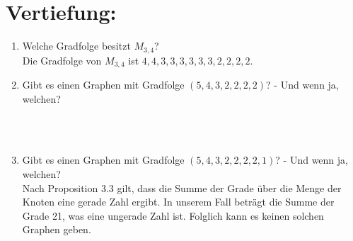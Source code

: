 

\usepackage{tikz} 


    \maketitle
    \section*{Vertiefung:}
    \begin{enumerate}[label=(\alph*)]
        \item Welche Gradfolge besitzt $M_{3,4}$?\\
        Die Gradfolge von $M_{3,4}$ ist $4,4,3,3,3,3,3,3,2,2,2,2$.

        \item Gibt es einen Graphen mit Gradfolge $(5, 4, 3, 2, 2, 2, 2)$? - Und wenn ja, welchen?\\
        \\\\

        \item Gibt es einen Graphen mit Gradfolge $(5, 4, 3, 2, 2, 2, 2, 1)$? - Und wenn ja, welchen?\\
        Nach Proposition 3.3 gilt, dass die Summe der Grade über die Menge der Knoten eine gerade Zahl ergibt. In unserem Fall beträgt die Summe der Grade 21, was eine ungerade Zahl ist. Folglich kann es keinen solchen Graphen geben. 


\end{enumerate}
